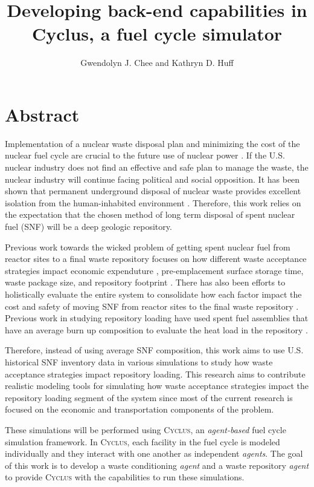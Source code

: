 \documentclass{anstrans}
\title{Developing back-end capabilities in Cyclus, a fuel cycle simulator}
\author{Gwendolyn J. Chee and Kathryn D. Huff}
\institute{
Dept. of Nuclear, Plasma and Radiological Engineering, University of Illinois at Urbana-Champaign \\
gchee2@illinois.edu
}
\begin{document}
\section{Abstract} 
Implementation of a nuclear waste disposal plan and minimizing the cost of the 
nuclear fuel cycle are crucial to the future use of nuclear power 
\cite{massachusetts_institute_of_technology_future_2003}. 
If the U.S. nuclear industry does not find an effective and safe plan to manage 
the waste, the nuclear industry will continue facing political and social 
opposition. 
It has been shown that permanent underground disposal of nuclear waste provides
excellent isolation from the human-inhabited environment 
\cite{rechard_evolution_2014}. 
Therefore, this work relies on the expectation that the chosen method of long 
term disposal of spent nuclear fuel (SNF) will be a deep geologic repository. 

Previous work towards the wicked problem of getting spent nuclear fuel from reactor 
sites to a final waste repository focuses on how different waste acceptance strategies 
impact economic expenduture \cite{nesbit_proposed_2015}, pre-emplacement 
surface storage time, waste package size, and repository 
footprint \cite{greenberg_application_2012}. 
There has also been efforts to holistically evaluate the entire system to consolidate 
how each factor impact the cost and safety of moving SNF from 
reactor sites to the final waste repository \cite{nutt_waste_2015}.
Previous work in studying repository loading have used spent fuel assemblies 
that have an average burn up composition \cite{johnson_optimizing_2016} 
to evaluate the heat load in the repository \cite{greenberg_application_2012}. 

Therefore, instead of using average SNF composition, this work aims to use U.S. 
historical SNF inventory data \cite{peterson_unf_standards_2017} in various 
simulations to study how waste acceptance strategies impact repository loading. 
This research aims to contribute realistic modeling tools for simulating how 
waste acceptance strategies impact the repository loading segment of the 
system since most of the current research is focused on the economic and 
transportation components of the problem. 

These simulations will be performed using \textsc{Cyclus}, an 
\textit{agent-based} fuel cycle simulation framework. 
In \textsc{Cyclus}, each facility in the fuel cycle is modeled individually 
and they interact with one another as independent \textit{agents}. 
The goal of this work is to develop a waste conditioning \textit{agent} 
and a waste repository \textit{agent} to provide \textsc{Cyclus} with 
the capabilities to run these simulations. 
 
\end{document}
